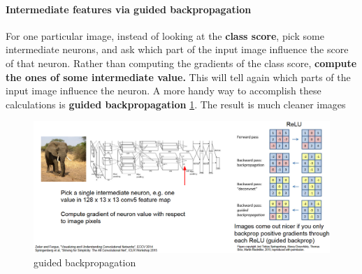 \documentclass[11pt]{article}
\begin{document}
\paragraph{Intermediate features via guided backpropagation}
For one particular image, instead of looking at the \textbf{class score}, pick some intermediate neurons, and ask which part of the input image influence the score of that  neuron. Rather than computing the gradients of the class score, \textbf{compute the ones of some intermediate value.} This will tell again which parts of the input image influence the neuron. A more handy way to accomplish these calculations is \textbf{guided backpropagation} \ref{fig:L1113}. The result is much cleaner images
\begin{figure}[h]
\centering
\captionsetup{justification=centering}
\includegraphics[width=0.81\linewidth]{L1113.pdf}
\caption{ guided backpropagation}
\label{fig:L1113}
\end{figure}
\clearpage
\end{document}
